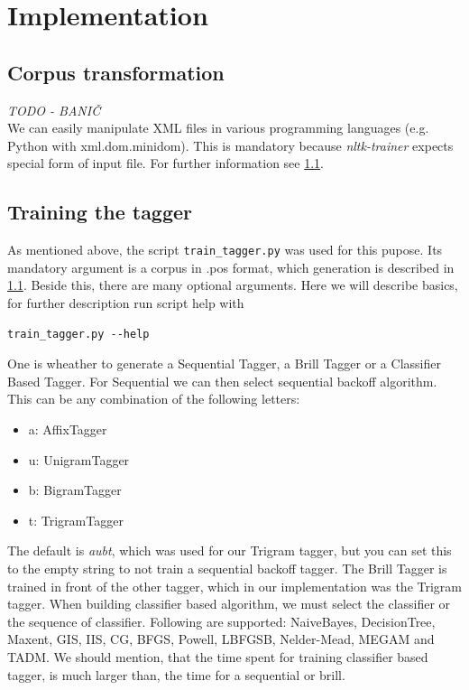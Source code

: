 \documentclass[11pt, conference, compsocconf]{IEEEtran}
\begin{document}
\section{Implementation}
\subsection{Corpus transformation} %
\label{Corpus transformation} 
\textit{TODO - BANIČ}\\
We can easily manipulate XML files in various programming languages (e.g. Python with xml.dom.minidom).
This is mandatory because \textit{nltk-trainer}\cite{nltk-trainer} expects special form of input file.
For further information see \ref{Corpus transformation}.

\subsection{Training the tagger} %
As mentioned above, the script \texttt{train\_tagger.py} was used for this pupose. Its mandatory argument is a corpus in .pos format, which generation is described in \ref{Corpus transformation}. Beside this, there are many optional arguments. Here we will describe basics, for further description run script help with
\begin{lstlisting}
train_tagger.py --help
\end{lstlisting}
\par
One is wheather to generate a Sequential Tagger, a Brill Tagger or a Classifier Based Tagger. For Sequential we can then select sequential backoff algorithm. This can be any combination of the following letters:
\begin{itemize}
\item a: AffixTagger
\item u: UnigramTagger
\item b: BigramTagger
\item t: TrigramTagger
\end{itemize}
The default is \textit{aubt}, which was used for our Trigram tagger, but you can set this to the empty string to not train a sequential backoff tagger. The Brill Tagger is trained in front of the other tagger, which in our implementation was the Trigram tagger. When building classifier based algorithm, we must select the classifier or the sequence of classifier. Following are supported: NaiveBayes, DecisionTree, Maxent, GIS, IIS, CG, BFGS, Powell, LBFGSB, Nelder-Mead, MEGAM and TADM. We should mention, that the time spent for training classifier based tagger, is much larger than, the time for a sequential or brill.
\end{document}
